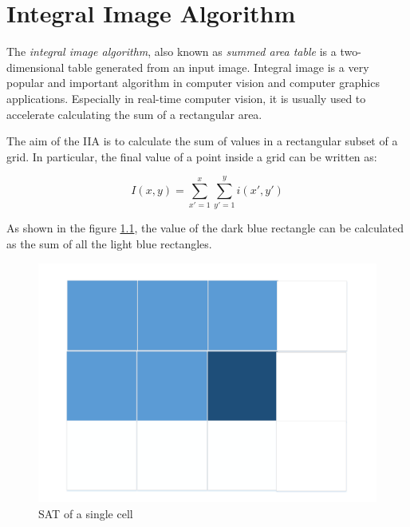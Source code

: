 

\chapter{Integral Image Algorithm}
 The \textit{integral image algorithm}, also known as \textit{summed area table} is a two-dimensional table generated from an input image. Integral image is a very popular and important algorithm in computer vision and computer graphics applications. Especially in real-time computer vision, it is usually used to accelerate calculating the sum of a rectangular area. 
 
  The aim of the IIA is to calculate the sum of values in a rectangular subset of a grid. In particular, the final value of a point inside a grid can be written as:
  
  \begin{equation} \label{eq:IIA eq}
  I(x,y)=\sum\limits_{x'=1}^{x}\sum\limits_{y'=1}^{y}  i(x',y')
  \end{equation}
   
   As shown in the figure \ref{fig:IIA}, the value of the dark blue rectangle can be calculated as the sum of all the light blue rectangles.
   
 
  	\begin{figure}[h]
  		\centering
  	 \includegraphics[scale=0.25]{imm/iia/Disegno1}  
   \caption{SAT of a single cell}
   \label{fig:IIA}
\end{figure}
  
